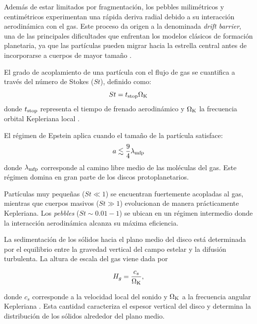 Además de estar limitados por fragmentación, los pebbles milimétricos y centimétricos experimentan una rápida deriva radial debido a su interacción aerodinámica con el gas. Este proceso da origen a la denominada \textit{drift barrier}, una de las principales dificultades que enfrentan los modelos clásicos de formación planetaria, ya que las partículas pueden migrar hacia la estrella central antes de incorporarse a cuerpos de mayor tamaño \citep{Laibe2012, Blum2018}.



 El grado de acoplamiento de una partícula con el flujo de gas se cuantifica a través del número de Stokes ($St$), definido como:
\begin{equation}
St = t_{\rm stop} \Omega_{\rm K}
\end{equation}
donde $t_{\rm stop}$ representa el tiempo de frenado aerodinámico y $\Omega_{\rm K}$ la frecuencia orbital Kepleriana local \citep{Weidenschilling1977, Birnstiel2012}.

El régimen de Epstein aplica cuando el tamaño de la partícula satisface:
\begin{equation}
a \lesssim \frac{9}{4}\lambda_{\rm mfp}
\end{equation}
donde $\lambda_{\rm mfp}$ corresponde al camino libre medio de las moléculas del gas. Este régimen domina en gran parte de los discos protoplanetarios.

Partículas muy pequeñas ($St \ll 1$) se encuentran fuertemente acopladas al gas, mientras que cuerpos masivos ($St \gg 1$) evolucionan de manera prácticamente Kepleriana. Los \textit{pebbles} ($St \sim 0.01 - 1$) se ubican en un régimen intermedio donde la interacción aerodinámica alcanza su máxima eficiencia.


La sedimentación de los sólidos hacia el plano medio del disco está determinada por el equilibrio entre la gravedad vertical del campo estelar y la difusión turbulenta. La altura de escala del gas viene dada por

\begin{equation}
H_g=\frac{c_s}{\Omega_{\rm K}},
\end{equation}

donde $c_s$ corresponde a la velocidad local del sonido y $\Omega_{\rm K}$ a la frecuencia angular Kepleriana \citep{Birnstiel2012, Ormel2017}. Esta cantidad caracteriza el espesor vertical del disco y determina la distribución de los sólidos alrededor del plano medio.

